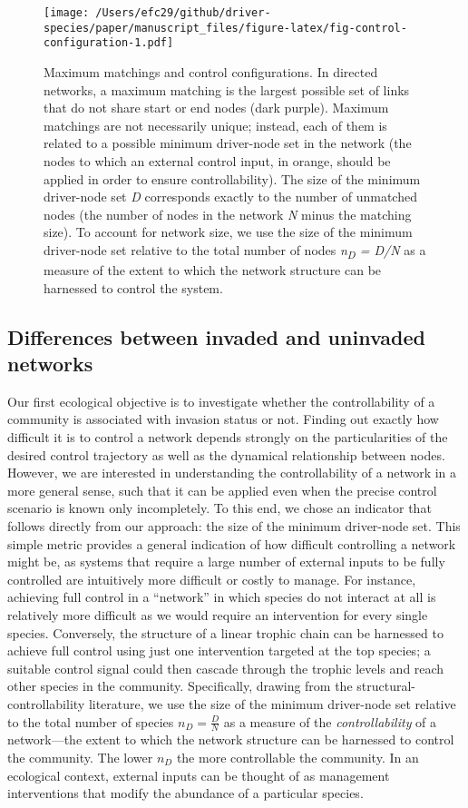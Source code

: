 \documentclass[a4paper]{artikel1}
\theoremstyle{definition}
\theoremstyle{definition}
\theoremstyle{definition}
\theoremstyle{remark}
\begin{document}
\begin{figure}
\centering
\texttt{[image: /Users/efc29/github/driver-species/paper/manuscript\_files/figure-latex/fig-control-configuration-1.pdf]}
\caption{\label{fig:fig-control-configuration}Maximum matchings and control
configurations. In directed networks, a maximum matching is the largest
possible set of links that do not share start or end nodes (dark
purple). Maximum matchings are not necessarily unique; instead, each of
them is related to a possible minimum driver-node set in the network
(the nodes to which an external control input, in orange, should be
applied in order to ensure controllability). The size of the minimum
driver-node set \emph{D} corresponds exactly to the number of unmatched
nodes (the number of nodes in the network \emph{N} minus the matching
size). To account for network size, we use the size of the minimum
driver-node set relative to the total number of nodes
\emph{n\textsubscript{D} = D/N} as a measure of the extent to which the
network structure can be harnessed to control the system.}
\end{figure}

\subsection{Differences between invaded and uninvaded
networks}\label{differences-between-invaded-and-uninvaded-networks}

Our first ecological objective is to investigate whether the
controllability of a community is associated with invasion status or
not. Finding out exactly how difficult it is to control a network
depends strongly on the particularities of the desired control
trajectory as well as the dynamical relationship between nodes. However,
we are interested in understanding the controllability of a network in a
more general sense, such that it can be applied even when the precise
control scenario is known only incompletely. To this end, we chose an
indicator that follows directly from our approach: the size of the
minimum driver-node set. This simple metric provides a general
indication of how difficult controlling a network might be, as systems
that require a large number of external inputs to be fully controlled
are intuitively more difficult or costly to manage. For instance,
achieving full control in a ``network'' in which species do not interact
at all is relatively more difficult as we would require an intervention
for every single species. Conversely, the structure of a linear trophic
chain can be harnessed to achieve full control using just one
intervention targeted at the top species; a suitable control signal
could then cascade through the trophic levels and reach other species in
the community. Specifically, drawing from the structural-controllability
literature, we use the size of the minimum driver-node set relative to
the total number of species \(n_D = \frac{D}{N}\) as a measure of the
\emph{controllability} of a network---the extent to which the network
structure can be harnessed to control the community. The lower \(n_D\)
the more controllable the community. In an ecological context, external
inputs can be thought of as management interventions that modify the
abundance of a particular species.
\end{document}
